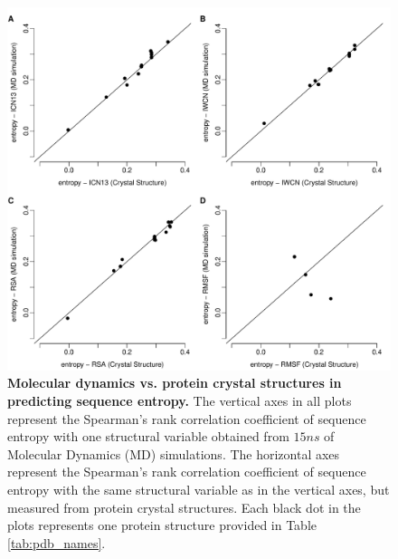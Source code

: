 \documentclass[12pt]{article}
\begin{document}
            \begin{figure}[tbh]
            \begin{center}
                \includegraphics[height=0.7\textheight]{cor_cr_md.pdf}
            \end{center}
            \caption{
                     {\bf Molecular dynamics vs. protein crystal structures in predicting sequence entropy.}
                     The vertical axes in all plots represent the Spearman's rank correlation coefficient of sequence entropy with one structural variable obtained from $15ns$ of Molecular Dynamics (MD) simulations. The horizontal axes represent the Spearman's rank correlation coefficient of sequence entropy with the same structural variable as in the vertical axes, but measured from protein crystal structures. Each black dot in the plots represents one protein structure provided in Table \ref{tab:pdb_names}. %
                     }
            \label{fig:cor_cr_md}
            \end{figure}
\end{document}
